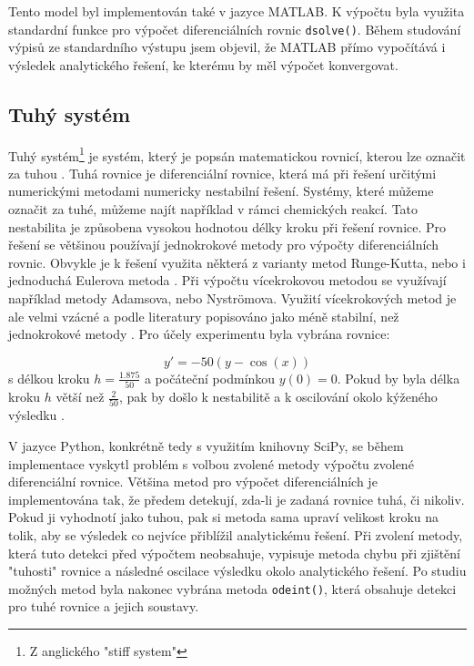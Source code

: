 Tento model byl implementován také v jazyce MATLAB. K výpočtu byla využita standardní funkce pro výpočet diferenciálních rovnic \texttt{dsolve()}. Během studování výpisů ze standardního výstupu jsem objevil, že MATLAB přímo vypočítává i výsledek analytického řešení, ke kterému by měl výpočet konvergovat. 


\subsection{Tuhý systém}
Tuhý systém\footnote{Z anglického "stiff system"} je systém, který je popsán matematickou rovnicí, kterou lze označit za tuhou \cite{hairer}. Tuhá rovnice je diferenciální rovnice, která má při řešení určitými numerickými metodami numericky nestabilní řešení. Systémy, které můžeme označit za tuhé, můžeme najít například v rámci chemických reakcí. Tato nestabilita je způsobena vysokou hodnotou délky kroku při řešení rovnice. Pro řešení se většinou používají jednokrokové metody pro výpočty diferenciálních rovnic. Obvykle je k řešení využita některá z varianty metod Runge-Kutta, nebo i jednoduchá Eulerova metoda \cite{IMS-skripta}. Při výpočtu vícekrokovou metodou se využívají například metody Adamsova, nebo Nyströmova. Využití vícekrokových metod je ale velmi vzácné a podle literatury popisováno jako méně stabilní, než jednokrokové metody \cite{hairer}. Pro účely experimentu byla vybrána rovnice:

\begin{equation}
    y' = -50(y - \cos{(x)})
\end{equation}
s délkou kroku $h = \frac{1.875}{50}$ a počáteční podmínkou $y(0) = 0$. Pokud by byla délka kroku $h$ větší než $\frac{2}{50}$, pak by došlo k nestabilitě a k oscilování okolo kýženého výsledku \cite{hairer}.

V jazyce Python, konkrétně tedy s využitím knihovny SciPy, se během implementace vyskytl problém s volbou zvolené metody výpočtu zvolené diferenciální rovnice. Většina metod pro výpočet diferenciálních je implementována tak, že předem detekují, zda-li je zadaná rovnice tuhá, či nikoliv. Pokud ji vyhodnotí jako tuhou, pak si metoda sama upraví velikost kroku na tolik, aby se výsledek co nejvíce přiblížil analytickému řešení. Při zvolení metody, která tuto detekci před výpočtem neobsahuje, vypisuje metoda chybu při zjištění "tuhosti" rovnice a následné oscilace výsledku okolo analytického řešení. Po studiu možných metod byla nakonec vybrána metoda \texttt{odeint()}, která obsahuje detekci pro tuhé rovnice a jejich soustavy.

